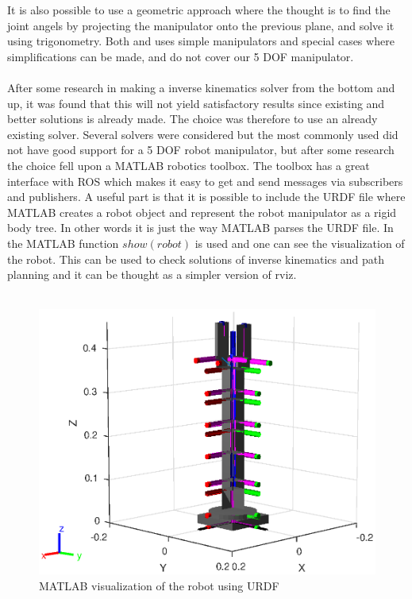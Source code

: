 It is also possible to use a geometric approach where the thought is to find the joint angels by projecting the manipulator onto the previous plane, and solve it using trigonometry\cite{spong}. Both \cite{Siciliano} and \cite{spong} uses simple manipulators and special cases where simplifications can be made, and do not cover our 5 DOF manipulator.\\\\
After some research in making a inverse kinematics solver from the bottom and up, it was found that this will not yield satisfactory results since existing and better solutions is already made. The choice was therefore to use an already existing solver. Several solvers were considered but the most commonly used did not have good support for a 5 DOF robot manipulator\cite{Ikfast,kdl}, but after some research the choice fell upon a MATLAB robotics toolbox\cite{MatlabRobTool}. The toolbox has a great interface with ROS which makes it easy to get and send messages via subscribers and publishers\cite{MatlabRobTool,ROSWiki}. A useful part is that it is possible to include the URDF file where MATLAB creates a robot object and represent the robot manipulator as a rigid body tree. In other words it is just the way MATLAB parses the URDF file. In  the MATLAB function $show(robot)$ is used and one can see the visualization of the robot. This can be used to check solutions of inverse kinematics and path planning and it can be thought as a simpler version of rviz.  \\\\
\begin{figure}[htbp]
  \centering
  \includegraphics[width=.9\textwidth]{img/showRobs.eps}
  \caption{MATLAB visualization of the robot using URDF}
  \label{fig:showRovs}
\end{figure}
